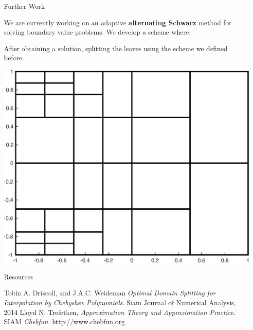 \documentclass{beamer}
\begin{document}
\begin{frame}{Further Work}
	\begin{center}
		We are currently working on an adaptive \textbf{alternating Schwarz} method for solving boundary value problems. We develop a scheme where:
	\end{center}
	\begin{center}
		After obtaining a solution, splitting the leaves using the scheme we defined before.
	\end{center}

	\begin{center}
		\includegraphics[scale = 0.3]{zonePlot2.eps}
	\end{center}
\end{frame}

\begin{frame}{Resources}
\begin{thebibliography}{9}
Tobin A. Driscoll, and J.A.C. Weideman
\textit{Optimal Domain Splitting for Interpolation by Chebyshev Polynomials}. 
Siam Journal of Numerical Analysis, 2014
Lloyd N. Trefethen,
\textit{Approximation Theory and Approximation Practice}. 
SIAM
\textit{Chebfun}. 
http://www.chebfun.org
\end{thebibliography}
\end{frame}
\end{document}

